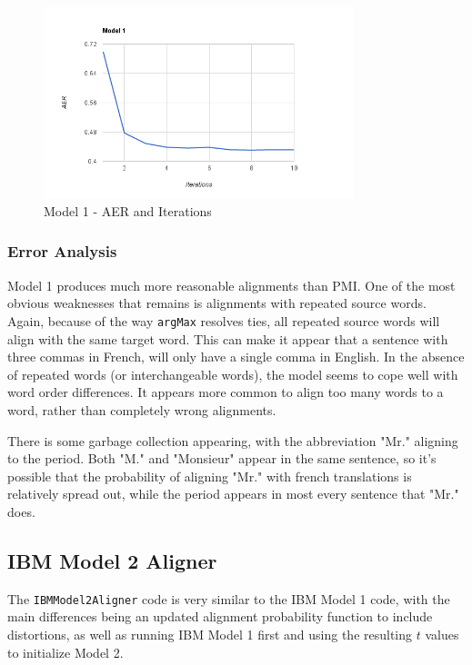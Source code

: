 \documentclass[11pt]{article}
\begin{document}
\begin{figure}[t]
\includegraphics[width=9cm]{model1}
\centering
\caption{Model 1 - AER and Iterations}
\label{figure:model1aer}
\end{figure}

\subsubsection{Error Analysis}

Model 1 produces much more reasonable alignments than PMI.  One of the most obvious
weaknesses that remains is alignments with repeated source words.  Again, because of
the way \texttt{argMax} resolves ties, all repeated source words will align with the
same target word.  This can make it appear that a sentence with three commas in French,
will only have a single comma in English.  In the absence of repeated words (or 
interchangeable words), the model seems to cope well with word order differences.  It appears
more common to align too many words to a word, rather than completely wrong alignments.

There is some garbage collection appearing, with the abbreviation "Mr." aligning
to the period.  Both "M." and "Monsieur" appear in the same sentence, so it's possible
that the probability of aligning "Mr." with french translations is relatively spread out,
while the period appears in most every sentence that "Mr." does.


\subsection{IBM Model 2 Aligner}

The \texttt{IBMModel2Aligner} code is very similar to the 
IBM Model 1 code, with the main differences being an updated alignment probability
function to include distortions, as well as running IBM Model 1 first and using
the resulting $ t $ values to initialize Model 2.  
\end{document}
